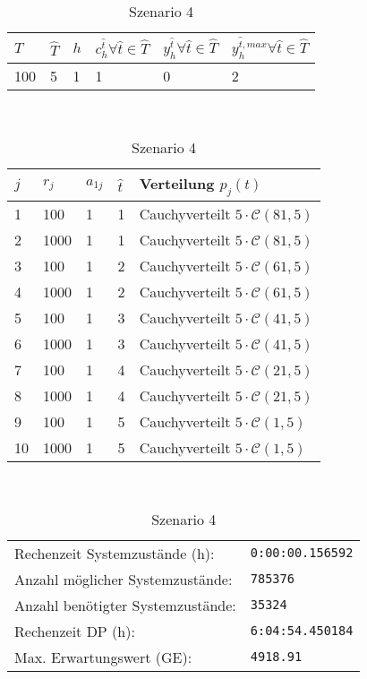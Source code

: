 \begin{table}[h!]
\renewcommand{\arraystretch}{1.5}
  \begin{center}
    \caption{Szenario 4}  \label{S4}
    \vspace*{3mm}
    \begin{tabular}{l l l l l l}   %
    $T$ & $\hat T$  & $h$ & $c_h^{\hat t}\forall \hat{t}\in{\hat T}$ & $y_h^{\hat t}\forall \hat{t}\in{\hat T}$  & $y_h^{{\hat t},max}\forall \hat{t}\in{\hat T}$  \\  \hline
100 & 5 & 1 & 1 & 0 & 2  \\ \hline
    \end{tabular} \\[3mm]
        \begin{tabular}{p{1cm} p{1cm} p{1cm}  p{1cm} p{6cm}}   %
    $j$ & $r_j$  & $a_{1j}$ & $\hat t$ & Verteilung $p_j(t)$ \\  \hline
1 & 100 & 1 & 1 & Cauchyverteilt $5\cdot\mathcal{C}(81, 5)$   \\
2 & 1000 & 1 & 1 & Cauchyverteilt $5\cdot\mathcal{C}(81, 5)$  \\
3 & 100 & 1 & 2 & Cauchyverteilt $5\cdot\mathcal{C}(61, 5)$  \\
4 & 1000 & 1 & 2 & Cauchyverteilt $5\cdot\mathcal{C}(61, 5)$  \\
5 & 100 & 1 & 3 & Cauchyverteilt $5\cdot\mathcal{C}(41, 5)$ \\
6 & 1000 & 1 & 3 & Cauchyverteilt $5\cdot\mathcal{C}(41, 5)$ \\
7 & 100 & 1 & 4 & Cauchyverteilt $5\cdot\mathcal{C}(21, 5)$  \\
8 & 1000 & 1 & 4 & Cauchyverteilt $5\cdot\mathcal{C}(21, 5)$  \\
9 & 100 & 1 & 5 & Cauchyverteilt $5\cdot\mathcal{C}(1, 5)$  \\
10 & 1000 & 1 & 5 & Cauchyverteilt $5\cdot\mathcal{C}(1, 5)$  \\ \hline
    \end{tabular} \\[3mm]
     \begin{tabular}{p{7cm}p{5cm}} \hline
     Rechenzeit Systemzustände (h): & \texttt{0:00:00.156592} \\
     Anzahl möglicher Systemzustände: & \texttt{785376} \\
     Anzahl benötigter Systemzustände: & \texttt{35324} \\ 
     Rechenzeit DP (h): & \texttt{6:04:54.450184} \\ 
          Max. Erwartungswert (GE): & \texttt{4918.91} \\ \hline
         \end{tabular} \\[3mm]
  \end{center}
\end{table}

